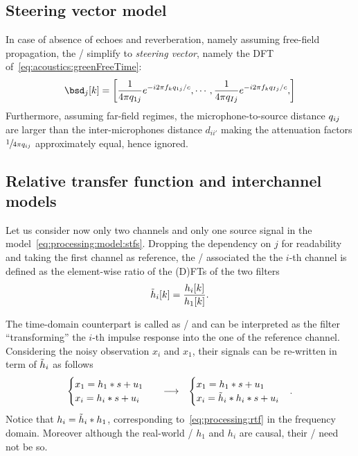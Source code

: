 \subsection{Steering vector model}
In case of absence of echoes and reverberation, namely assuming free-field propagation,
the \RIRs/ simplify to \textit{steering vector}, namely the DFT of~\cref{eq:acoustics:greenFreeTime}:
\begin{equation}\label{eq:processing:steering}
    \bsd_{j}[k] = \klist{\frac{1}{4 \pi \distMicSrc_{1j}} \cste^{-\csti 2 \pi f_k \distMicSrc_{1j} / c},
                            \cdots,
                            \frac{1}{4 \pi \distMicSrc_{Ij}} \cste^{-\csti 2 \pi f_k \distMicSrc_{Ij} / c},
                    }
\end{equation}
Furthermore, assuming far-field regimes, the microphone-to-source distance $q_{ij}$ are larger than the
inter-microphones distance $d_{ii'}$ making the attenuation factors $\sfrac{1}{4 \pi q_{ij}}$ approximately equal, hence ignored.

\subsection{Relative transfer function and interchannel models}
Let us consider now only two channels and only one source signal in the model~\cref{eq:processing:model:stfs}.
Dropping the dependency on $j$ for readability and taking the first channel as reference, the \RTFdef/ associated the the $i$-th channel is defined as
the element-wise ratio of the (D)FTs of the two filters~
\begin{equation}\label{eq:processing:rtf}
    \tilde{h}_i[k] = \frac{h_i[k]}{h_1[k]}
    .
\end{equation}

The time-domain counterpart is called as \ReIRdef/ and can be interpreted as the filter ``transforming'' the $i$-th impulse response into the one of the reference channel.
Considering the noisy observation $x_i$ and $x_1$, their signals can be re-written in term of $\tilde{h}_i$ as follows
\begin{equation}
    \begin{matrix}
    \begin{cases}
        x_1 = h_1 \ast s + u_1 \\
        x_i = h_i \ast s + u_i
    \end{cases} & \longrightarrow  & \begin{cases}
        x_1 = h_1 \ast s + u_1 \\
        x_i = \tilde{h}_i \ast h_i \ast s + u_i
    \end{cases}
    \end{matrix}
    .
\end{equation}
Notice that $h_i = \tilde{h}_i \ast h_1$, corresponding to~\cref{eq:processing:rtf} in the frequency domain.
Moreover although the real-world \RIRs/ $h_1$ and $h_i$ are causal, their \RTF/ need not be so.

